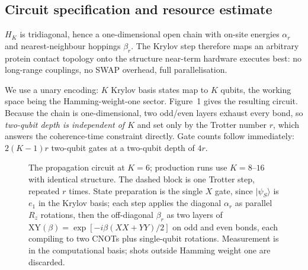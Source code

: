 \documentclass[10pt,a4paper]{article}
\begin{document}
\subsection{Circuit specification and resource estimate}

$H_K$ is tridiagonal, hence a one-dimensional open chain with on-site energies $\alpha_r$ and
nearest-neighbour hoppings $\beta_r$. The Krylov step therefore maps an arbitrary protein contact
topology onto the structure near-term hardware executes best: no long-range couplings, no SWAP overhead, full parallelisation.

We use a unary encoding: $K$ Krylov basis states map to $K$ qubits, the working space being the
Hamming-weight-one sector. Figure~1 gives the resulting circuit. Because the chain is
one-dimensional, two odd/even layers exhaust every bond, so \emph{two-qubit depth is independent of
$K$} and set only by the Trotter number $r$, which answers the coherence-time constraint directly. Gate counts follow immediately: $2(K-1)r$ two-qubit gates at a two-qubit depth of $4r$.

\begin{figure}[t]
\centering
{}
\caption{The propagation circuit at $K=6$; production runs use $K=8$--$16$ with identical structure.
The dashed block is one Trotter step, repeated $r$ times. State preparation is the single $X$ gate,
since $|\psi_S\rangle$ is $e_1$ in the Krylov basis; each step applies the diagonal $\alpha_r$ as
parallel $R_z$ rotations, then the off-diagonal $\beta_r$ as two layers of
$\mathrm{XY}(\beta)=\exp[-i\beta(XX+YY)/2]$ on odd and even bonds, each compiling to two CNOTs plus
single-qubit rotations. Measurement is in the computational basis; shots outside Hamming weight one
are discarded.}
\end{figure}
\end{document}
